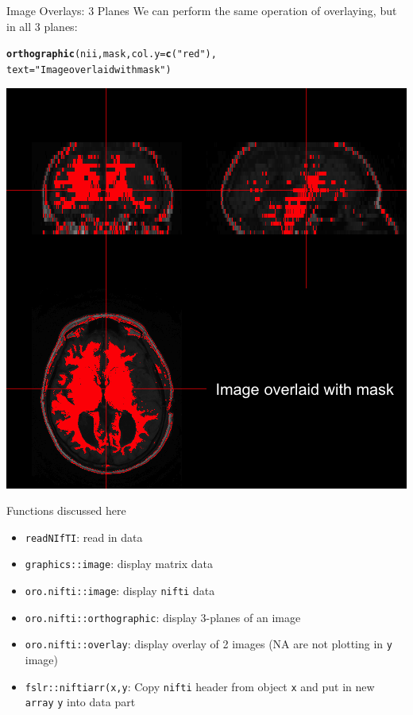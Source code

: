 \documentclass[11pt]{beamer}\usepackage[]{graphicx}\usepackage[]{color}
\makeatletter
\newcommand{\hlstr}[1]{\textcolor[rgb]{0.192,0.494,0.8}{#1}}%
\newcommand{\hlstd}[1]{\textcolor[rgb]{0.345,0.345,0.345}{#1}}%
\newcommand{\hlkwc}[1]{\textcolor[rgb]{0.333,0.667,0.333}{#1}}%
\newcommand{\hlkwd}[1]{\textcolor[rgb]{0.737,0.353,0.396}{\textbf{#1}}}%
\newenvironment{kframe}{%
 \def\at@end@of@kframe{}%
 \ifinner\ifhmode%
  \def\at@end@of@kframe{\end{minipage}}%
  \begin{minipage}{\columnwidth}%
 \fi\fi%
 \def\FrameCommand##1{\hskip\@totalleftmargin \hskip-\fboxsep
 \colorbox{shadecolor}{##1}\hskip-\fboxsep
     \hskip-\linewidth \hskip-\@totalleftmargin \hskip\columnwidth}%
 \MakeFramed {\advance\hsize-\width
   \@totalleftmargin\z@ \linewidth\hsize
   \@setminipage}}%
 {\par\unskip\endMakeFramed%
 \at@end@of@kframe}
\newenvironment{knitrout}{}{} %
\makeatother
\begin{document}
\begin{frame}[fragile]{Image Overlays: 3 Planes}
We can perform the same operation of overlaying, but in all 3 planes:
\begin{center}
\begin{knitrout}
\color{fgcolor}\begin{kframe}
\begin{alltt}
\hlkwd{orthographic}\hlstd{(nii, mask,} \hlkwc{col.y}\hlstd{=} \hlkwd{c}\hlstd{(}\hlstr{"red"}\hlstd{),}
             \hlkwc{text} \hlstd{=}\hlstr{"Image overlaid with mask"}\hlstd{)}
\end{alltt}
\end{kframe}
\includegraphics[width=\textwidth,height=0.5\textheight,keepaspectratio]{figure/image_ortho_overlay-1} 

\end{knitrout}
\end{center}

\end{frame}


\begin{frame}[fragile]{Functions discussed here}
\begin{itemize}
\item \verb|readNIfTI|: read in data
\item \verb|graphics::image|: display matrix data
\item \verb|oro.nifti::image|: display \verb|nifti| data
\item \verb|oro.nifti::orthographic|: display 3-planes of an image
\item \verb|oro.nifti::overlay|: display overlay of 2 images (NA are not plotting in \verb|y| image)
\item \verb|fslr::niftiarr(x,y|: Copy \verb|nifti| header from object \verb|x| and put in new \verb|array| \verb|y| into data part
\end{itemize}

\end{frame}
\end{document}

